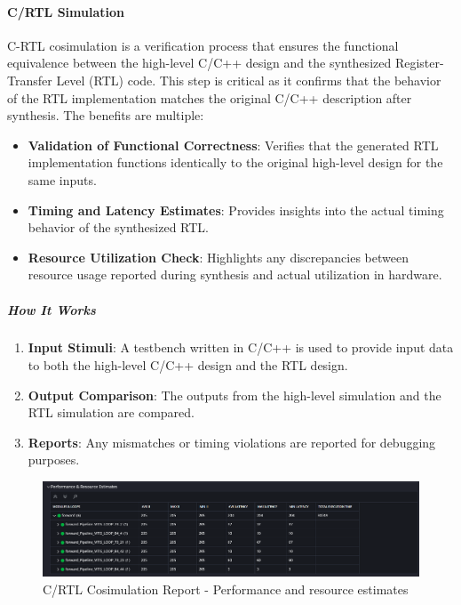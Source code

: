 \documentclass{article}
\begin{document}
\paragraph{C/RTL Simulation}

C-RTL cosimulation is a verification process that ensures the functional equivalence between the high-level C/C++ design and the synthesized Register-Transfer Level (RTL) code. This step is critical as it confirms that the behavior of the RTL implementation matches the original C/C++ description after synthesis. The benefits are multiple:

\begin{itemize}
    \item \textbf{Validation of Functional Correctness}: Verifies that the generated RTL implementation functions identically to the original high-level design for the same inputs.
    \item \textbf{Timing and Latency Estimates}: Provides insights into the actual timing behavior of the synthesized RTL.
    \item \textbf{Resource Utilization Check}: Highlights any discrepancies between resource usage reported during synthesis and actual utilization in hardware.
\end{itemize}

\subparagraph{How It Works}
\begin{enumerate}
    \item \textbf{Input Stimuli}: A testbench written in C/C++ is used to provide input data to both the high-level C/C++ design and the RTL design.
    \item \textbf{Output Comparison}: The outputs from the high-level simulation and the RTL simulation are compared.
    \item \textbf{Reports}: Any mismatches or timing violations are reported for debugging purposes.
\end{enumerate}


\begin{figure}[H]
    \centering
    \includegraphics[width=1\textwidth]{./assets/MLP/c-rtl-cosimulation.png}
    \caption{C/RTL Cosimulation Report - Performance and resource estimates}
    \label{fig:C-RTL-cosimulation}
\end{figure}
\end{document}
